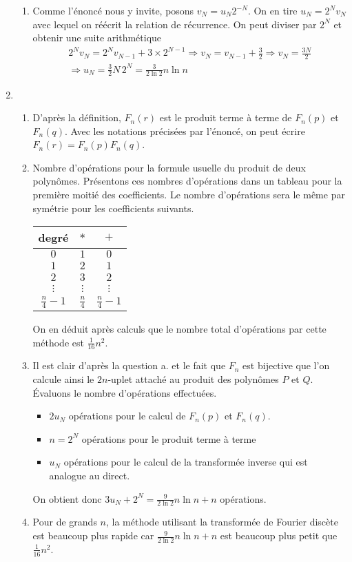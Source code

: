 \begin{enumerate}
\begin{enumerate}
 \item Comme l'énoncé nous y invite, posons $v_N= u_N2^{-N}$. On en tire $u_N=2^{N}v_N$ avec lequel on réécrit la relation de récurrence. On peut diviser par $2^{N}$ et obtenir une suite arithmétique
\begin{multline*}
 2^Nv_N=2^Nv_{N-1}+3\times 2^{N-1}
\Rightarrow v_N=v_{N-1}+\frac{3}{2}\Rightarrow v_N =\frac{3N}{2}\\
\Rightarrow u_N=\frac{3}{2}N\,2^N=\frac{3}{2\ln 2}n\ln n
\end{multline*}

\end{enumerate}

 \item
\begin{enumerate}
 \item D'après la définition, $F_n(r)$ est le produit terme à terme de $F_n(p)$ et $F_n(q)$. Avec les notations précisées par l'énoncé, on peut écrire $F_n(r)=F_n(p)F_n(q)$.
 \item Nombre d'opérations pour la formule usuelle du produit de deux polynômes. Présentons ces nombres d'opérations dans un tableau pour la première moitié des coefficients. Le nombre d'opérations sera le même par symétrie pour les coefficients suivants.
\begin{center}\renewcommand{\arraystretch}{1.8}
\begin{tabular}{|c|c|c|} \hline
degré & $*$ & $+$\\ \hline
$0$ & $1$ & $0$\\ \hline
$1$ & $2$ & $1$\\ \hline
$2$ & $3$ & $2$\\ \hline
$\vdots$ & $\vdots$ & $\vdots$\\ \hline
$\frac{n}{4}-1$ & $\frac{n}{4}$ & $\frac{n}{4}-1$ \\ \hline
\end{tabular}
\end{center}
On en déduit après calculs que le nombre total d'opérations par cette méthode est $\frac{1}{16}n^2$.
 \item Il est clair d'après la question a. et le fait que $F_n$ est bijective que l'on calcule ainsi le $2n$-uplet attaché au produit des polynômes $P$ et $Q$.\newline
\'Evaluons le nombre d'opérations effectuées.
\begin{itemize}
 \item $2u_N$ opérations pour le calcul de $F_n(p)$ et $F_n(q)$.
 \item $n=2^N$ opérations pour le produit terme à terme
 \item $u_N$ opérations pour le calcul de la transformée inverse qui est analogue au direct.
\end{itemize}
On obtient donc $3u_N + 2^N=\frac{9}{2\ln 2}n\ln n +n$ opérations.
 \item Pour de grands $n$, la méthode utilisant la transformée de Fourier discète est beaucoup plus rapide car $\frac{9}{2\ln 2}n\ln n +n$ est beaucoup plus petit que $\frac{1}{16}n^2$.
\end{enumerate}

\end{enumerate}
